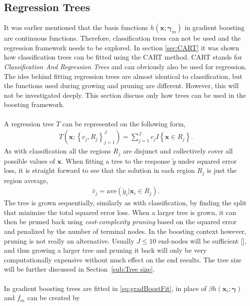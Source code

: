 \subsection{Regression Trees}
\label{sub:Regression Trees}
It was earlier mentioned that the basis functions $h(\mathbf{x}; \bm{\gamma}_m)$ in gradient boosting are continuous functions. Therefore, classification trees can not be used and the regression framework needs to be explored.
In section \ref{sec:CART} it was shown how classification trees can be fitted using the CART method. CART stands for \textit{Classification And Regression Trees} and can obviously also be used for regression. The ides behind fitting regression trees are almost identical to classification, but the functions used during growing and pruning are different. However, this will not be investigated deeply. This section discuss only how trees can be used in the boosting framework.\\
\\
A regression tree $T$ can be represented on the following form,
\begin{align}
  T(\mathbf{x}; \left\{ c_j, R_j \right\}_{j = 1}^J)  = \sum^{J}_{j=1} c_j I\left\{ \mathbf{x} \in R_j \right\}.
\end{align}
As with classification all the regions $R_j$ are disjunct and collectively cover all possible values of $\mathbf{x}$. 
When fitting a tree to the response $\tilde y$ under squared error loss, it is straight forward to see that the solution in each region $R_j$ is just the region average,
\begin{align}
  \hat{c}_j = \mathrm{ave}(\tilde y_i | \mathbf{x}_i \in R_j).
\end{align}
The tree is grown sequentially, similarly as with classification, by finding the split that minimize the total squared error loss. When a larger tree is grown, it can then be pruned back using \textit{cost-complexity pruning} based on the squared error and penalized by the number of terminal nodes. In the boosting context however, pruning is not really an alternative. Usually $J \leq 10$ end-nodes will be sufficient [\cite{modstat}], and thus growing a larger tree and pruning it back will only be very computationally expensive without much effect on the end results. The tree size will be further discussed in Section~\ref{sub:Tree size}.\\
\\
In gradient boosting trees are fitted in \eqref{eq:gradBoostFit}, in place of $\beta h(\mathbf{x}_i; \bm{\gamma})$ and $f_m$ can be created by
